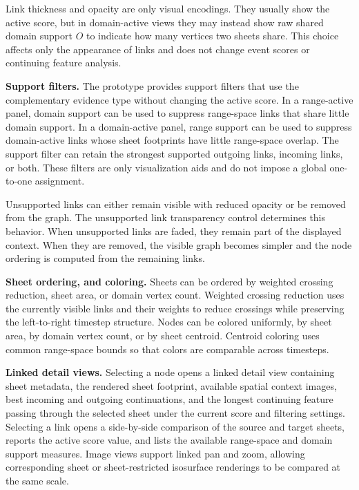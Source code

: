 \documentclass[review]{vgtc}
\newcommand{\myparagraph}[1]{\vspace{1mm} \noindent \textbf{#1}}
\begin{document}
Link thickness and opacity are only visual encodings. They usually show the active score, but in domain-active views they may instead show raw shared domain support $O$ to indicate how many vertices two sheets share. This choice affects only the appearance of links and does not change event scores or continuing feature analysis.




\myparagraph{Support filters.}
The prototype provides support filters that use the complementary evidence type without changing the active score. In a range-active panel, domain support can be used to suppress range-space links that share little domain support. In a domain-active panel, range support can be used to suppress domain-active links whose sheet footprints have little range-space overlap. The support filter can retain the strongest supported outgoing links, incoming links, or both. These filters are only visualization aids and do not impose a global one-to-one assignment.

Unsupported links can either remain visible with reduced opacity or be removed from the graph. The unsupported link transparency control determines this behavior. When unsupported links are faded, they remain part of the displayed context. When they are removed, the visible graph becomes simpler and the node ordering is computed from the remaining links.

\myparagraph{Sheet ordering, and coloring.}
Sheets can be ordered by weighted crossing reduction, sheet area, or domain vertex count. Weighted crossing reduction uses the currently visible links and their weights to reduce crossings while preserving the left-to-right timestep structure. Nodes can be colored uniformly, by sheet area, by domain vertex count, or by sheet centroid. Centroid coloring uses common range-space bounds so that colors are comparable across timesteps.

\myparagraph{Linked detail views.}
Selecting a node opens a linked detail view containing sheet metadata, the rendered sheet footprint, available spatial context images, best incoming and outgoing continuations, and the longest continuing feature passing through the selected sheet under the current score and filtering settings. Selecting a link opens a side-by-side comparison of the source and target sheets, reports the active score value, and lists the available range-space and domain support measures. Image views support linked pan and zoom, allowing corresponding sheet or sheet-restricted isosurface renderings to be compared at the same scale.
\end{document}
